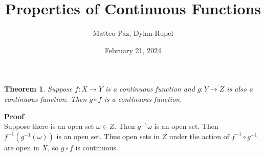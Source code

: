 \documentclass{article}
\author{Matteo Paz, Dylan Rupel}
\date{February 21, 2024}
\title{Properties of Continuous Functions}
\newcommand{\pf}{\noindent \textbf{Proof} \\}
\newcommand{\inv}{^{-1}}
\newtheorem{thm}{Theorem}
\begin{document}
\maketitle{}

\begin{thm}
Suppose $f: X \to Y$ is a continuous function and $g: Y \to Z$ is also a continuous function. Then
$g \circ f$ is a continuous function.
\end{thm}
\pf 
Suppose there is an open set $\omega \in Z$. Then $g\inv \omega$ is an open set. Then $f\inv (g\inv (\omega))$ is an open
set. Thus open sets in $Z$ under the action of $f\inv \circ g\inv$ are open in $X$, so $g \circ f$ is continuous.
\vspace{2em}
\end{document}
